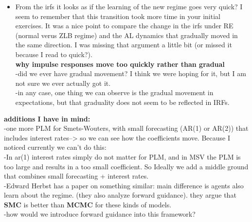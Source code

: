 \documentclass[12pt,reqno]{article}
\numberwithin{equation}{section}
\begin{document}
\begin{itemize}
\item From the irfs it looks as if the learning of the new regime goes very quick? I seem to remember that this transition took more time in your initial exercises. It was a nice point to compare the change in the irfs under RE (normal verus ZLB regime) and the AL dynamics that gradually moved in the same direction. I was missing that argument a little bit (or missed it because I read to quick?). \\

\textbf{why impulse responses move too quickly rather than gradual} \\

-did we ever have gradual movement? I think we were hoping for it, but I am not sure we ever actually got it. \\
-in any case, one thing we can observe is the gradual movement in expectations, but that graduality does  not seem to be reflected in IRFs.

\end{itemize}




\textbf{additions I have in mind:} \\

-one more PLM for Smets-Wouters, with small forecasting (AR(1) or AR(2)) that includes interest rates--> so we can see how the coefficients move. Because I noticed currently we can't do this: \\
-In ar(1) interest rates simply do not matter for PLM, and in MSV the PLM is too large and results in a too small coefficient. So Ideally we add a middle ground that combines small forecasting + interest rates. \\
-Edward Herbst has a paper on something similar: main difference is agents also learn about the regime. (they also analyze forward guidance). they argue that \textbf{SMC} is better than \textbf{MCMC} for these kinds of models. \\
-how would we introduce forward guidance into this framework? \\
\end{document}
